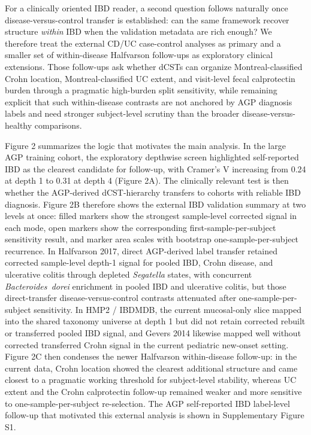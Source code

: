 \documentclass[
  11pt,
]{article}
\newcommand{\taxon}[1]{\emph{#1}}
\begin{document}
For a clinically oriented IBD reader, a second question follows
naturally once disease-versus-control transfer is established: can the
same framework recover structure \emph{within} IBD when the validation
metadata are rich enough? We therefore treat the external CD/UC
case-control analyses as primary and a smaller set of within-disease
Halfvarson follow-ups as exploratory clinical extensions. Those
follow-ups ask whether dCSTs can organize Montreal-classified Crohn
location, Montreal-classified UC extent, and visit-level fecal
calprotectin burden through a pragmatic high-burden split sensitivity,
while remaining explicit that such
within-disease contrasts are not anchored by AGP diagnosis labels and
need stronger subject-level scrutiny than the broader disease-versus-
healthy comparisons.

Figure 2 summarizes the logic that motivates the main analysis. In the
large AGP training cohort, the exploratory depthwise screen highlighted
self-reported IBD as the clearest candidate for follow-up, with
Cramer's V increasing from 0.24 at depth 1 to 0.31 at depth 4
(Figure 2A). The
clinically relevant test is then whether the AGP-derived dCST-hierarchy
transfers to cohorts with reliable IBD diagnosis. Figure 2B therefore
shows the external IBD validation summary at two levels at once:
filled markers show the strongest sample-level corrected signal in each
mode, open markers show the corresponding first-sample-per-subject
sensitivity result, and marker area scales with bootstrap
one-sample-per-subject recurrence. In Halfvarson 2017, direct
AGP-derived label transfer retained corrected sample-level depth-1
signal for pooled IBD, Crohn disease, and ulcerative colitis through
depleted \taxon{Segatella} states, with concurrent
\taxon{Bacteroides~dorei} enrichment in pooled IBD and ulcerative
colitis, but those direct-transfer disease-versus-control contrasts
attenuated after one-sample-per-subject sensitivity. In HMP2 /
IBDMDB, the current mucosal-only slice mapped into the shared taxonomy
universe at depth 1 but did not retain corrected rebuilt or transferred
pooled IBD signal, and Gevers 2014 likewise mapped well without
corrected transferred Crohn signal in the current pediatric new-onset
setting. Figure 2C
then condenses the newer Halfvarson within-disease follow-up: in the
current data, Crohn location showed the clearest additional structure
and came closest to a pragmatic working threshold for subject-level
stability, whereas UC extent and the Crohn calprotectin follow-up
remained weaker and more sensitive to
one-sample-per-subject re-selection. The AGP
self-reported IBD label-level
follow-up that motivated this external analysis is shown in
Supplementary Figure S1.
\end{document}
